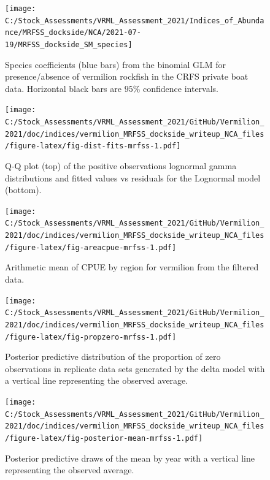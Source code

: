 \documentclass[
  english,
  a4paper,
]{article}
\begin{document}
\FloatBarrier

\begin{figure}
\texttt{[image: C:/Stock\_Assessments/VRML\_Assessment\_2021/Indices\_of\_Abundance/MRFSS\_dockside/NCA/2021-07-19/MRFSS\_dockside\_SM\_species]} \caption{Species coefficients (blue bars) from the binomial GLM for presence/absence of vermilion rockfish in the CRFS private boat data. Horizontal black bars are $95\%$ confidence intervals.}\label{fig:fig-sm-mrfss}
\end{figure}

\begin{figure}
\centering
\texttt{[image: C:/Stock\_Assessments/VRML\_Assessment\_2021/GitHub/Vermilion\_2021/doc/indices/vermilion\_MRFSS\_dockside\_writeup\_NCA\_files/figure-latex/fig-dist-fits-mrfss-1.pdf]}
\caption{\label{fig:fig-dist-fits-mrfss}Q-Q plot (top) of the positive observations lognormal gamma distributions and fitted values vs residuals for the Lognormal model (bottom).}
\end{figure}

\FloatBarrier

\begin{figure}
\centering
\texttt{[image: C:/Stock\_Assessments/VRML\_Assessment\_2021/GitHub/Vermilion\_2021/doc/indices/vermilion\_MRFSS\_dockside\_writeup\_NCA\_files/figure-latex/fig-areacpue-mrfss-1.pdf]}
\caption{\label{fig:fig-areacpue-mrfss}Arithmetic mean of CPUE by region for vermilion from the filtered data.}
\end{figure}

\begin{figure}
\centering
\texttt{[image: C:/Stock\_Assessments/VRML\_Assessment\_2021/GitHub/Vermilion\_2021/doc/indices/vermilion\_MRFSS\_dockside\_writeup\_NCA\_files/figure-latex/fig-propzero-mrfss-1.pdf]}
\caption{\label{fig:fig-propzero-mrfss}Posterior predictive distribution of the proportion of zero observations in replicate data sets generated by the delta model with a vertical line representing the observed average.}
\end{figure}

\begin{figure}
\centering
\texttt{[image: C:/Stock\_Assessments/VRML\_Assessment\_2021/GitHub/Vermilion\_2021/doc/indices/vermilion\_MRFSS\_dockside\_writeup\_NCA\_files/figure-latex/fig-posterior-mean-mrfss-1.pdf]}
\caption{\label{fig:fig-posterior-mean-mrfss}Posterior predictive draws of the mean by year with a vertical line representing the observed average.}
\end{figure}
\end{document}
